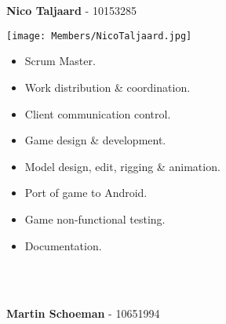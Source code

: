 \documentclass[letterpaper]{article}
\begin{document}
		\vspace{0.2in}
	\section*{\colorbox{black}{}} 
		\vspace{0.1in}
		
		\begin{Large} 
			\textbf{Nico Taljaard} - 10153285 \\
		\end{Large}
		
		\begin{minipage}[l]{0.23\textwidth}
			\begin{flushleft}
				\texttt{[image: Members/NicoTaljaard.jpg]}
			\end{flushleft}
		\end{minipage}
		\begin{minipage}[r]{0.75\textwidth}
			\begin{itemize}
				\item Scrum Master.
				\item Work distribution \& coordination.
				\item Client communication control.
				\item Game design \& development.
				\item Model design, edit, rigging \& animation.
				\item Port of game to Android.
				\item Game non-functional testing.
				\item Documentation.
			\end{itemize}
		\end{minipage} \\ \\
		
		\begin{flushleft}
			\begin{Large}
				\textbf{Martin Schoeman} - 10651994 \\
			\end{Large}
		\end{flushleft}
		
\end{document}
